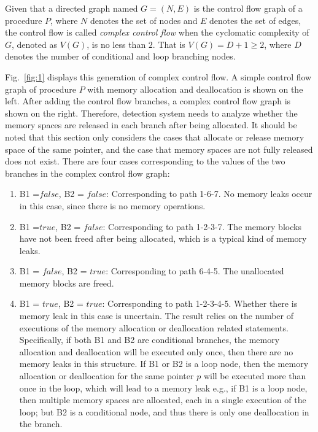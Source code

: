\begin{definition}
Given that a directed graph named $G= (N, E)$ is the control flow graph of a procedure $P$, where $N$ denotes the set of nodes and $E$ denotes the set of edges, the control flow is called \emph{complex control flow} when the cyclomatic complexity of $G$, denoted as $V(G)$, is no less than $2$. That is $V(G)=D+1\geq 2$, where $D$ denotes the number of conditional and loop branching nodes.
\end{definition} 

Fig.~\ref{fig:1} displays this generation of complex control flow. A simple control flow graph of procedure $P$ with memory allocation and deallocation is shown on the left. After adding the control flow branches, a complex control flow graph is shown on the right. Therefore, detection system needs to analyze whether the memory spaces are released in each branch after being allocated. It should be noted that this section only considers the cases that allocate or release memory space of the same pointer, and the case that memory spaces are not fully released does not exist. There are four cases corresponding to the values of the two branches in the complex control flow graph:
\begin{enumerate}
\item
B1 =$\mathit{false}$, B2 = $\mathit{false}$: Corresponding to path 1-6-7. No memory leaks occur in this case, since there is no memory operations.
\item
B1 =$\mathit{true}$, B2 = $\mathit{false}$: Corresponding to path 1-2-3-7. The memory blocks have not been freed after being allocated, which is a typical kind of memory leaks.
\item 
B1 = $\mathit{false}$, B2 = $\mathit{true}$: Corresponding to path 6-4-5. The unallocated memory blocks are freed.
\item
B1 = $\mathit{true}$, B2 = $\mathit{true}$: Corresponding to path 1-2-3-4-5. Whether there is memory leak in this case is uncertain. The result relies on the number of executions of the memory allocation or deallocation related statements. Specifically, if both B1 and B2 are conditional branches, the memory allocation and deallocation will be executed only once, then there are no memory leaks in this structure. If B1 or B2 is a loop node, then the memory allocation or deallocation for the same pointer $p$ will be executed more than once in the loop, which will lead to a memory leak e.g., if B1 is a loop node, then multiple memory spaces are allocated, each in a single execution of the loop; but B2 is a conditional node, and thus there is only one deallocation in the branch. %
\end{enumerate}

